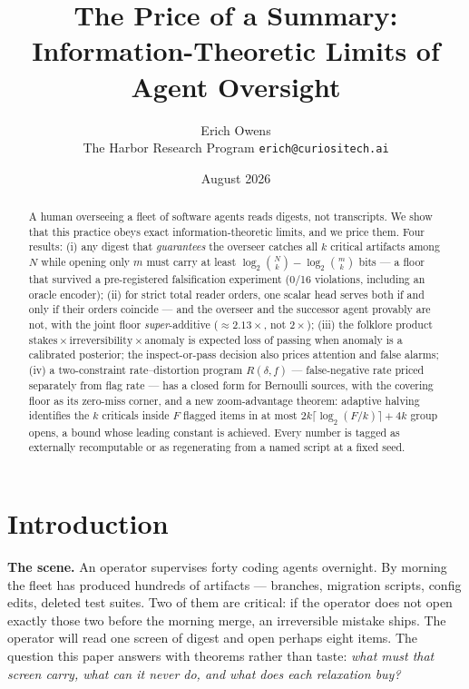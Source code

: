 \documentclass[11pt,a4paper]{article}
\title{\textbf{The Price of a Summary:}\\[4pt]
\large Information-Theoretic Limits of Agent Oversight}
\author{Erich Owens\\ \normalsize The Harbor Research Program \quad \texttt{erich@curiositech.ai}}
\date{August 2026}
\begin{document}
\maketitle

\begin{abstract}
\noindent A human overseeing a fleet of software agents reads digests, not transcripts. We show that this practice obeys exact information-theoretic limits, and we price them. Four results: (i) any digest that \emph{guarantees} the overseer catches all $k$ critical artifacts among $N$ while opening only $m$ must carry at least $\log_2\binom{N}{k}-\log_2\binom{m}{k}$ bits --- a floor that survived a pre-registered falsification experiment (0/16 violations, including an oracle encoder); (ii) for strict total reader orders, one scalar head serves both if and only if their orders coincide --- and the overseer and the successor agent provably are not, with the joint floor \emph{super}-additive ($\approx 2.13\times$, not $2\times$); (iii) the folklore product $\mathrm{stakes}\times\mathrm{irreversibility}\times\mathrm{anomaly}$ is expected loss of passing when anomaly is a calibrated posterior; the inspect-or-pass decision also prices attention and false alarms; (iv) a two-constraint rate--distortion program $R(\delta,f)$ --- false-negative rate priced separately from flag rate --- has a closed form for Bernoulli sources, with the covering floor as its zero-miss corner, and a new zoom-advantage theorem: adaptive halving identifies the $k$ criticals inside $F$ flagged items in at most $2k\lceil\log_2(F/k)\rceil+4k$ group opens, a bound whose leading constant is achieved. Every number is tagged as externally recomputable or as regenerating from a named script at a fixed seed.
\end{abstract}

\section{Introduction}\label{sec:intro}
\textbf{The scene.} An operator supervises forty coding agents overnight. By morning the fleet has produced hundreds of artifacts --- branches, migration scripts, config edits, deleted test suites. Two of them are critical: if the operator does not open exactly those two before the morning merge, an irreversible mistake ships. The operator will read one screen of digest and open perhaps eight items. The question this paper answers with theorems rather than taste: \emph{what must that screen carry, what can it never do, and what does each relaxation buy?}
\end{document}
